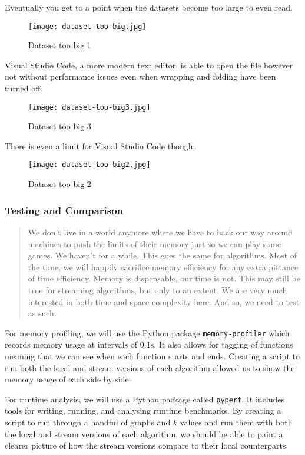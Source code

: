 Eventually you get to a point when the datasets become too large to even
read.

\begin{figure}[h]
    \centering
    \texttt{[image: dataset-too-big.jpg]}
    \caption{Dataset too big 1}
\end{figure}

Visual Studio Code, a more modern text editor, is able to open the file
however not without performance issues even when wrapping and folding
have been turned off.

\begin{figure}[h]
    \centering
    \texttt{[image: dataset-too-big3.jpg]}
    \caption{Dataset too big 3}
\end{figure}

There is even a limit for Visual Studio Code though.

\begin{figure}[h]
    \centering
    \texttt{[image: dataset-too-big2.jpg]}
    \caption{Dataset too big 2}
\end{figure}

\subsubsection{Testing and Comparison}

\begin{quote}
    We don't live in a world anymore where we have to hack our way around
    machines to push the limits of their memory just so we can play some
    games. We haven't for a while. This goes the same for algorithms. Most
    of the time, we will happily sacrifice memory efficiency for any extra
    pittance of time efficiency. Memory is dispensable, our time is not.
    This may still be true for streaming algorithms, but only to an extent.
    We are very much interested in both time and space complexity here. And
    so, we need to test as such.
\end{quote}

For memory profiling, we will use the Python package
\texttt{memory-profiler} which records memory usage at intervals of
\(0.1\text{s}\). It also allows for tagging of functions meaning that we
can see when each function starts and ends. Creating a script to run
both the local and stream versions of each algorithm allowed us to show
the memory usage of each side by side.

For runtime analysis, we will use a Python package called
\texttt{pyperf}. It includes tools for writing, running, and analysing
runtime benchmarks. By creating a script to run through a handful of
graphs and \(k\) values and run them with both the local and stream
versions of each algorithm, we should be able to paint a clearer picture
of how the stream versions compare to their local counterparts.

